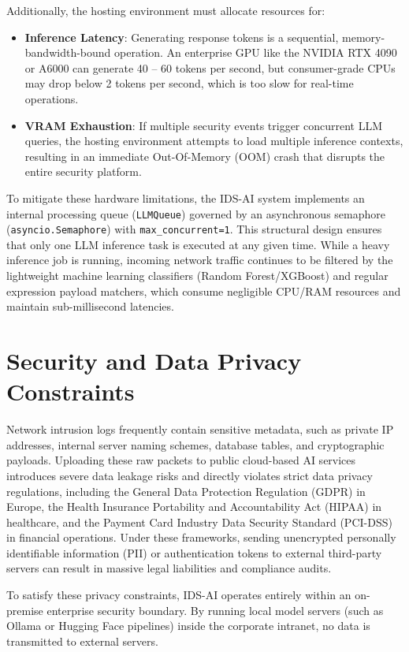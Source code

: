 \documentclass[12pt,a4paper]{report}
\begin{document}
Additionally, the hosting environment must allocate resources for:
\begin{itemize}[leftmargin=1.5em]
  \item \textbf{Inference Latency}: Generating response tokens is a sequential, memory-bandwidth-bound operation. An enterprise GPU like the NVIDIA RTX 4090 or A6000 can generate 40 -- 60 tokens per second, but consumer-grade CPUs may drop below 2 tokens per second, which is too slow for real-time operations.
  \item \textbf{VRAM Exhaustion}: If multiple security events trigger concurrent LLM queries, the hosting environment attempts to load multiple inference contexts, resulting in an immediate Out-Of-Memory (OOM) crash that disrupts the entire security platform.
\end{itemize}

To mitigate these hardware limitations, the IDS-AI system implements an internal processing queue (\texttt{LLMQueue}) governed by an asynchronous semaphore (\texttt{asyncio.Semaphore}) with \texttt{max\_concurrent=1}. This structural design ensures that only one LLM inference task is executed at any given time. While a heavy inference job is running, incoming network traffic continues to be filtered by the lightweight machine learning classifiers (Random Forest/XGBoost) and regular expression payload matchers, which consume negligible CPU/RAM resources and maintain sub-millisecond latencies.

\section{Security and Data Privacy Constraints}

Network intrusion logs frequently contain sensitive metadata, such as private IP addresses, internal server naming schemes, database tables, and cryptographic payloads. Uploading these raw packets to public cloud-based AI services introduces severe data leakage risks and directly violates strict data privacy regulations, including the General Data Protection Regulation (GDPR) in Europe, the Health Insurance Portability and Accountability Act (HIPAA) in healthcare, and the Payment Card Industry Data Security Standard (PCI-DSS) in financial operations. Under these frameworks, sending unencrypted personally identifiable information (PII) or authentication tokens to external third-party servers can result in massive legal liabilities and compliance audits.

To satisfy these privacy constraints, IDS-AI operates entirely within an on-premise enterprise security boundary. By running local model servers (such as Ollama or Hugging Face pipelines) inside the corporate intranet, no data is transmitted to external servers.
\end{document}
